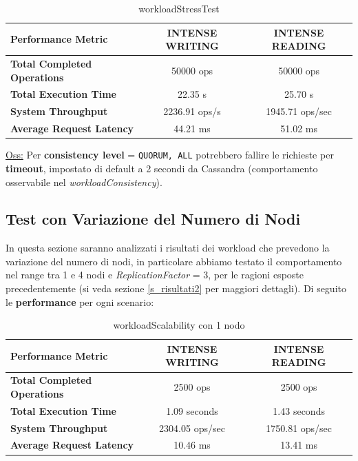 \documentclass[12pt]{article}
\begin{document}
\begin{table}[H]
\centering
\begin{tabular}{|l|c|c|}
\hline
\textbf{Performance Metric} & \textbf{INTENSE WRITING} & \textbf{INTENSE READING} \\
\hline
\textbf{Total Completed Operations} & 50000 ops & 50000 ops \\
\hline
\textbf{Total Execution Time} & 22.35 s & 25.70 s \\
\hline
\textbf{System Throughput} & 2236.91 ops/s & 1945.71 ops/sec \\
\hline
\textbf{Average Request Latency} & 44.21 ms & 51.02 ms \\
\hline
\end{tabular}
\caption{workloadStressTest}
\label{t_stressTest}
\end{table}

\noindent
\underline{Oss:} Per \textbf{consistency level} = \texttt{QUORUM, ALL} potrebbero fallire le richieste per \textbf{timeout}, impostato di default a 2 secondi da Cassandra (comportamento osservabile nel \textit{workloadConsistency}).

\subsection{Test con Variazione del Numero di Nodi}
In questa sezione saranno analizzati i risultati dei workload che prevedono la variazione del numero di nodi, in particolare abbiamo testato il comportamento nel range tra 1 e 4 nodi e \textit{ReplicationFactor} = 3, per le ragioni esposte precedentemente (si veda sezione \ref{s_risultati2} per maggiori dettagli).\newline\newline
\noindent
Di seguito le \textbf{performance} per ogni scenario:

\begin{table}[H]
\centering
\begin{tabular}{|l|c|c|}
\hline
\textbf{Performance Metric} & \textbf{INTENSE WRITING} & \textbf{INTENSE READING} \\
\hline
\textbf{Total Completed Operations} & 2500 ops & 2500 ops \\
\hline
\textbf{Total Execution Time} & 1.09 seconds & 1.43 seconds \\
\hline
\textbf{System Throughput} & 2304.05 ops/sec & 1750.81 ops/sec \\
\hline
\textbf{Average Request Latency} & 10.46 ms & 13.41 ms \\
\hline
\end{tabular}
\caption{workloadScalability con 1 nodo}
\label{t_1node}
\end{table}
\end{document}
